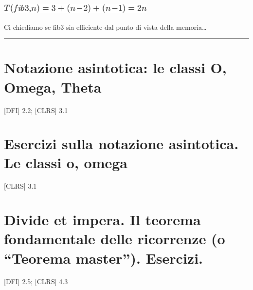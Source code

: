 \documentclass{article}
\begin{document}
{}

\includegraphics{images/image68.png}

{}

{Ci chiediamo se fib3 sia efficiente dal punto di vista della
memoria\ldots{}}

\begin{center}\rule{0.5\linewidth}{\linethickness}\end{center}

\section{\texorpdfstring{{}}{}}\label{h.t0xc4p18h6wu}

\hypertarget{h.jkxlloc1lefg}{\section{\texorpdfstring{{Notazione
asintotica: le classi O, Omega, Theta
}}{Notazione asintotica: le classi O, Omega, Theta }}\label{h.jkxlloc1lefg}}

{{[}DFI{]} 2.2; {[}CLRS{]} 3.1}

{}

{}

{}

\hypertarget{h.tn5j57miv2l8}{\section{\texorpdfstring{{Esercizi sulla
notazione asintotica. Le classi o,
omega}}{Esercizi sulla notazione asintotica. Le classi o, omega}}\label{h.tn5j57miv2l8}}

{{[}CLRS{]} 3.1}

{}

{}

\hypertarget{h.qp9ilz1tito1}{\section{\texorpdfstring{{Divide et impera.
Il teorema fondamentale delle ricorrenze (o ``Teorema master'').
Esercizi.}}{Divide et impera. Il teorema fondamentale delle ricorrenze (o Teorema master). Esercizi.}}\label{h.qp9ilz1tito1}}

{{[}DFI{]} 2.5; {[}CLRS{]} 4.3}

{}

{}
\end{document}
